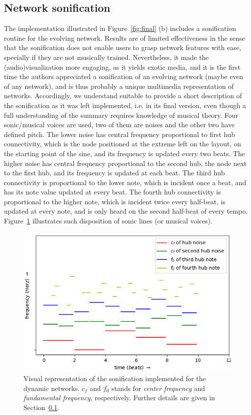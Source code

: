 \documentclass[runningheads]{llncs}
\begin{document}
\subsection{Network sonification}\label{sson}
The implementation illustrated in Figure~\ref{fig:final} (b) includes a sonification routine for the evolving network.
Results are of limited effectiveness in the sense that the sonification does not enable users to grasp network features with ease,
specially if they are not musically trained.
Nevertheless, it made the (audio)visualization more engaging, as it yields exotic media,
and it is the first time the authors appreciated a sonification of an evolving network (maybe even of any network),
and is thus probably a unique multimedia representation of networks.
Accordingly, we understand suitable to provide a short description of the sonification as it was left implemented,
i.e. in its final version,
even though a full understanding of the summary requires knowledge of musical theory.
Four sonic/musical voices are used, two of them are noises and the other two have defined pitch. The lower noise has central frequency proportional to first hub connectivity,
which is the node positioned at the extreme left on the layout, on the starting point of the sine, and its frequency is updated every two beats.
The higher noise has central frequency proportional to the second hub, the node next to the first hub, and its frequency is updated at each beat.
The third hub connectivity is proportional to the lower note,
which is incident once a beat, and has its note value updated at every beat.
The fourth hub connectivity is proportional to the higher note, which is incident twice every half-beat, is updated at every note, and is only heard on the second half-beat of every tempo.
Figure~\ref{fson} illustrates such disposition of sonic lines (or musical voices).

\begin{figure}[!h]\centering
\includegraphics[width=.9\textwidth]{sonif}
  \caption{Visual representation of the sonification implemented for the dynamic networks.
  $c_f$ and $f_0$ stands for \emph{center frequency} and \emph{fundamental frequency}, respectively.
  Further details are given in Section~\ref{sson}.
  }\label{fson}
\end{figure}
\end{document}
